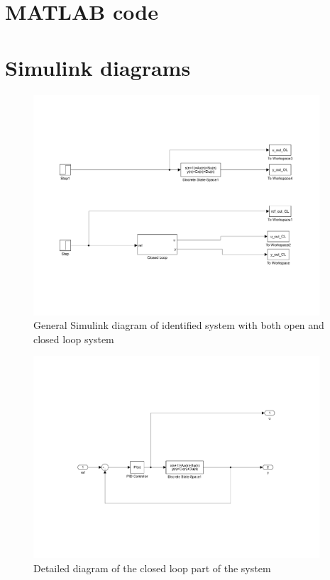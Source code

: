 \chapter{MATLAB code}\label{ch:matlab}



\chapter{Simulink diagrams}\label{ch:simulink}

\begin{figure}[ht!]
	\centering
	\includegraphics[width=0.95\textwidth]{fig/simulink/system_general.pdf}
	\caption{General Simulink diagram of identified system with both open and closed loop system}
	\label{fig:system_simulink}
\end{figure}

\begin{figure}[ht!]
	\centering
	\includegraphics[width=0.95\textwidth]{fig/simulink/system_CL.pdf}
	\caption{Detailed diagram of the closed loop part of the system}
	\label{fig:system_CL}
\end{figure}

